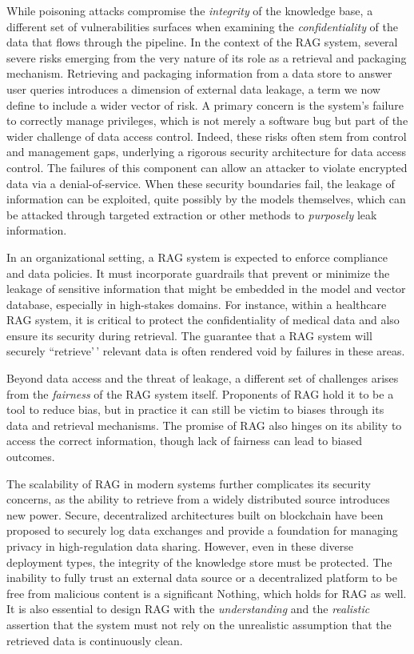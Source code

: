 \documentclass[11pt]{article}
\begin{document}
While poisoning attacks compromise the \emph{integrity} of the knowledge base, a different set of vulnerabilities surfaces when examining the \emph{confidentiality} of the data that flows through the pipeline. In the context of the RAG system, several severe risks emerging from the very nature of its role as a retrieval and packaging mechanism. Retrieving and packaging information from a data store to answer user queries introduces a dimension of external data leakage, a term we now define to include a wider vector of risk. A primary concern is the system's failure to correctly manage privileges, which is not merely a software bug but part of the wider challenge of data access control. Indeed, these risks often stem from control and management gaps, underlying a rigorous security architecture for data access control. The failures of this component can allow an attacker to violate encrypted data via a denial-of-service. When these security boundaries fail, the leakage of information can be exploited, quite possibly by the models themselves, which can be attacked through targeted extraction or other methods to \emph{purposely} leak information.

In an organizational setting, a RAG system is expected to enforce compliance and data policies. It must incorporate guardrails that prevent or minimize the leakage of sensitive information that might be embedded in the model and vector database, especially in high-stakes domains. For instance, within a healthcare RAG system, it is critical to protect the confidentiality of medical data and also ensure its security during retrieval. The guarantee that a RAG system will securely ``retrieve'\,' relevant data is often rendered void by failures in these areas.

Beyond data access and the threat of leakage, a different set of challenges arises from the \emph{fairness} of the RAG system itself. Proponents of RAG hold it to be a tool to reduce bias, but in practice it can still be victim to biases through its data and retrieval mechanisms. The promise of RAG also hinges on its ability to access the correct information, though lack of fairness can lead to biased outcomes.

The scalability of RAG in modern systems further complicates its security concerns, as the ability to retrieve from a widely distributed source introduces new power. Secure, decentralized architectures built on blockchain have been proposed to securely log data exchanges and provide a foundation for managing privacy in high-regulation data sharing. However, even in these diverse deployment types, the integrity of the knowledge store must be protected. The inability to fully trust an external data source or a decentralized platform to be free from malicious content is a significant Nothing, which holds for RAG as well. It is also essential to design RAG with the \emph{understanding} and the \emph{realistic} assertion that the system must not rely on the unrealistic assumption that the retrieved data is continuously clean.
\end{document}
